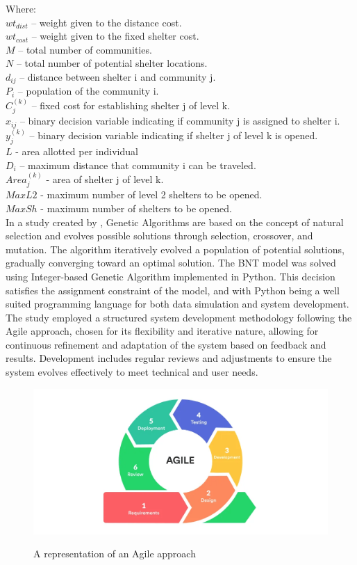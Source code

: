 \documentclass[12pt,a4paper,]{article}
\begin{document}
	\noindent Where:
	\\$wt_{dist}$ – weight given to the distance cost.
	\\$wt_{cost}$ – weight given to the fixed shelter cost.
	\\$M$ – total number of communities.
	\\$N$ – total number of potential shelter locations.
	\\$d_{ij}$ – distance between shelter i and community j.
	\\$P_{i}$ – population of the community i.
	\\$C_{j}^{(k)}$ – fixed cost for establishing shelter j of level k.
	\\$x_{ij}$ – binary decision variable indicating if community j is assigned to shelter i.
	\\$y_{j}^{(k)}$ – binary decision variable indicating if shelter j of level k is opened.
	\\$L$ - area allotted per individual
	\\$D_{i}$ – maximum distance that community i can be traveled.
	\\$Area_{j}^{(k)}$ - area of shelter j of level k.
	\\$MaxL2$ - maximum number of level 2 shelters to be opened.
	\\$MaxSh$ - maximum number of shelters to be opened.
	\\
	
	In a study created by \textcite{Mathew2012}, Genetic Algorithms are based on the concept of natural selection and evolves possible solutions through selection, crossover, and mutation. The algorithm iteratively evolved a population of potential solutions, gradually converging toward an optimal solution.
	The BNT model was solved using Integer-based Genetic Algorithm implemented in Python. This decision satisfies the assignment constraint of the model, and with Python being a well suited programming language for both data simulation and system development.
	The study employed a structured system development methodology following the Agile approach, chosen for its flexibility and iterative nature, allowing for continuous refinement and adaptation of the system based on feedback and results. Development includes regular reviews and adjustments to ensure the system evolves effectively to meet technical and user needs.
	
		\begin{figure}[h!]
		\caption{A representation of an Agile approach}
		\centering
		\includegraphics[width=\columnwidth]{AGILE}
		\label{Agile}
	\end{figure}
	
\end{document}
